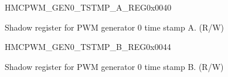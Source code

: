 \begin{register}{H}{MCPWM\_GEN0\_TSTMP\_A\_REG}{0x0040}\label{regdesc:MCPWMGEN0TSTMPAREG}
%
%
\regnewline%
\begin{regdesc}\begin{reglist}
\label{fielddesc:MCPWMGEN0A}\item [MCPWM\_GEN0\_A] Shadow register for PWM generator 0 time stamp A. (R/W)
\end{reglist}\end{regdesc}
\end{register}


\begin{register}{H}{MCPWM\_GEN0\_TSTMP\_B\_REG}{0x0044}\label{regdesc:MCPWMGEN0TSTMPBREG}
%
%
\regnewline%
\begin{regdesc}\begin{reglist}
\label{fielddesc:MCPWMGEN0B}\item [MCPWM\_GEN0\_B] Shadow register for PWM generator 0 time stamp B. (R/W)
\end{reglist}\end{regdesc}
\end{register}


